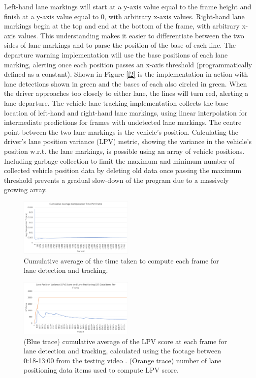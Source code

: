 \documentclass[9pt,conference]{IEEEtran}
\begin{document}
Left-hand lane markings will start at a y-axis value equal to the frame height and finish at a y-axis value equal to 0, with arbitrary x-axis values. Right-hand lane markings begin at the top and end at the bottom of the frame, with arbitrary x-axis values. This understanding makes it easier to differentiate between the two sides of lane markings and to parse the position of the base of each line. The departure warning implementation will use the base positions of each lane marking, alerting once each position passes an x-axis threshold (programmatically defined as a constant). Shown in Figure \ref{f2} is the implementation in action with lane detections shown in green and the bases of each also circled in green. When the driver approaches too closely to either lane, the lines will turn red, alerting a lane departure. The vehicle lane tracking implementation collects the base location of left-hand and right-hand lane markings, using linear interpolation for intermediate predictions for frames with undetected lane markings. The centre point between the two lane markings is the vehicle's position. Calculating the driver's lane position variance (LPV) metric, showing the variance in the vehicle's position w.r.t. the lane markings, is possible using an array of vehicle positions. Including garbage collection to limit the maximum and minimum number of collected vehicle position data by deleting old data once passing the maximum threshold prevents a gradual slow-down of the program due to a massively growing array.

\begin{figure}[htbp]
    \centerline{\includegraphics[width=0.5\textwidth]{assets/LD_Avg-FPT.png}}
    \caption{Cumulative average of the time taken to compute each frame for lane detection and tracking.}
    \label{f3}
\end{figure}

\begin{figure}[htbp]
    \centerline{\includegraphics[width=0.5\textwidth]{assets/LD_Avg-LPV.png}}
    \caption{(Blue trace) cumulative average of the LPV score at each frame for lane detection and tracking, calculated using the footage between 0:18-13:00 from the testing video \cite{b8}. (Orange trace) number of lane positioning data items used to compute LPV score.}
    \label{f4}
\end{figure}
\end{document}
